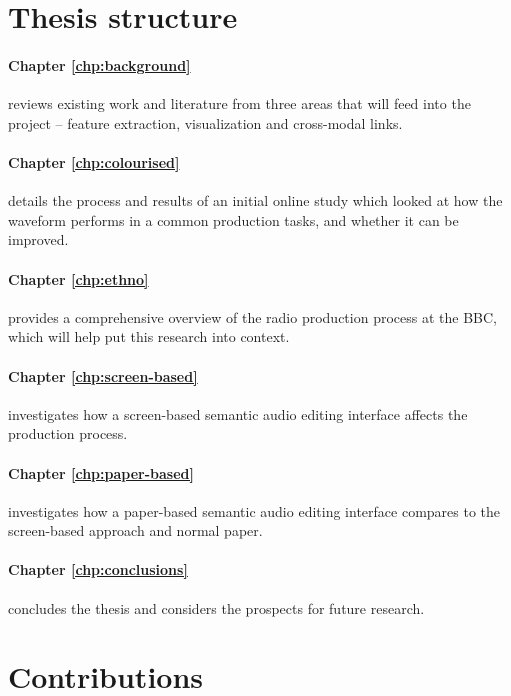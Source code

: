 \section{Thesis structure}\label{sec:intro/structure}

\paragraph{Chapter \ref{chp:background}} reviews existing work and literature
from three areas that will feed into the project -- feature extraction,
visualization and cross-modal links.

\paragraph{Chapter \ref{chp:colourised}} details the process and results of an
initial online study which looked at how the waveform performs in a common
production tasks, and whether it can be improved.

\paragraph{Chapter \ref{chp:ethno}} provides a comprehensive overview of
the radio production process at the BBC, which will help put this research into
context.

\paragraph{Chapter \ref{chp:screen-based}} investigates how a screen-based semantic audio editing interface affects the
production process.

\paragraph{Chapter \ref{chp:paper-based}} investigates how a paper-based semantic audio editing interface compares to
the screen-based approach and normal paper.

\paragraph{Chapter \ref{chp:conclusions}} concludes the thesis and considers the prospects for future research.

\section{Contributions}\label{sec:intro/contributions}

